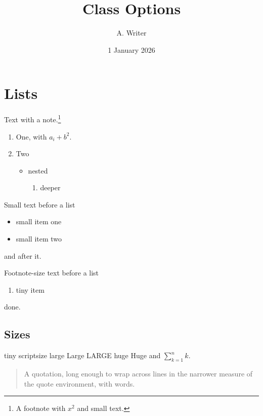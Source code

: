 \documentclass[a5paper,landscape]{article}
\begin{document}
\title{Class Options}\author{A. Writer}\date{1 January 2026}\maketitle
\section{Lists}
Text with a note.\footnote{A footnote with $x^2$ and \small small text.}
\begin{enumerate}
\item One, with $a_i + b^2$.
\item Two
  \begin{itemize}
  \item nested
    \begin{enumerate}
    \item deeper
    \end{enumerate}
  \end{itemize}
\end{enumerate}
{\small Small text before a list
\begin{itemize}
\item small item one
\item small item two
\end{itemize}
and after it.}
{\footnotesize Footnote-size text before a list
\begin{enumerate}
\item tiny item
\end{enumerate}
done.}
\subsection{Sizes}
{\tiny tiny} {\scriptsize scriptsize} {\large large} {\Large Large} {\LARGE LARGE} {\huge huge} {\Huge Huge} and $\sum_{k=1}^n k$.
\begin{quote}
A quotation, long enough to wrap across lines in the narrower measure of the quote environment, with words.
\end{quote}
\end{document}
